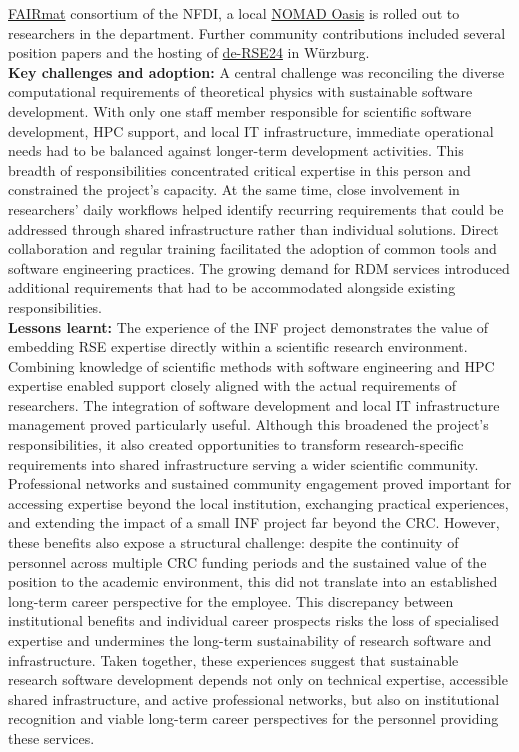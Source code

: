 \documentclass{eceasst}
\begin{document}
\href{https://www.fairmat-nfdi.eu/fairmat/}{FAIRmat} consortium of the NFDI, a local
\href{https://nomad-lab.eu/nomad-lab/nomad.html}{NOMAD Oasis}
is rolled out to researchers in the department.
Further community contributions included several position papers
\cite{Anzt:2020,Goth:2025,gi2025,Kempf2026} and the hosting of
\href{https://events.hifis.net/event/994/overview}{de-RSE24} in Würzburg.
\\
\noindent\textbf{Key challenges and adoption:}
A central challenge was reconciling the diverse computational
requirements of theoretical physics with sustainable software
development. With only one staff member responsible
for scientific software development, HPC support, and local IT
infrastructure, immediate operational needs had to be balanced
against longer-term development activities.
This breadth of responsibilities concentrated critical expertise in this person
and constrained the project's capacity.
At the same time, close involvement in researchers' daily
workflows helped identify recurring requirements that could
be addressed through shared infrastructure rather than
individual solutions. Direct collaboration and regular
training facilitated the adoption of common tools and
software engineering practices. The growing demand for RDM
services introduced additional requirements that had to be
accommodated alongside existing responsibilities.
\\
\noindent\textbf{Lessons learnt:}
The experience of the INF project demonstrates the value of embedding
RSE expertise directly within a scientific
research environment. Combining knowledge of scientific methods with
software engineering and HPC expertise enabled support closely aligned
with the actual requirements of researchers.
The integration of software development and local IT infrastructure
management proved particularly useful.
Although this broadened the project's responsibilities, it also created opportunities to transform research-specific requirements into shared infrastructure serving a wider scientific community.
Professional networks and sustained community engagement proved important for accessing expertise beyond the local institution, exchanging practical experiences,
and extending the impact of a small INF project far beyond the CRC.
However, these benefits also expose a structural challenge: despite the continuity of personnel across multiple CRC funding periods and the sustained value of the position to the academic environment, this did not translate into an established long-term career perspective for the employee.
This discrepancy between institutional benefits and individual
career prospects risks the loss of specialised expertise and
undermines the long-term sustainability of research software
and infrastructure.
Taken together, these experiences suggest that sustainable research
software development depends not only on technical expertise,
accessible shared infrastructure, and active professional networks,
but also on institutional recognition and viable long-term career
perspectives for the personnel providing these services.
\end{document}
